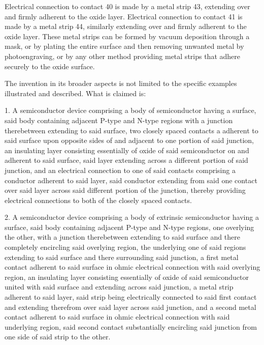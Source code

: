 Electrical connection to contact 40 is made by a metal strip 43, extending over and firmly adherent to the oxide layer. Electrical connection to contact 41 is made by a metal strip 44, similarly extending over and firmly adherent to the oxide layer. These metal strips can be formed by vacuum deposition through a mask, or by plating the entire surface and then removing unwanted metal by photoengraving, or by any other method providing metal strips that adhere securely to the oxide surface.

The invention in its broader aspects is not limited to the specific examples illustrated and described. What is claimed is:

1. A semiconductor device comprising a body of semiconductor having a surface, said body containing adjacent P-type and N-type regions with a junction therebetween extending to said surface, two closely spaced contacts a adherent to said surface upon opposite sides of and adjacent to one portion of said junction, an insulating layer consisting essentially of oxide of said semiconductor on and adherent to said surface, said layer extending across a different portion of said junction, and an electrical connection to one of said contacts comprising a conductor adherent to said layer, said conductor extending from said one contact over said layer across said different portion of the junction, thereby providing electrical connections to both of the closely spaced contacts.

2. A semiconductor device comprising a body of extrinsic semiconductor having a surface, said body containing adjacent P-type and N-type regions, one overlying the other, with a junction therebetween extending to said surface and there completely encircling said overlying region, the underlying one of said regions extending to said surface and there surrounding said junction, a first metal contact adherent to said surface in ohmic electrical connection with said overlying region, an insulating layer consisting essentially of oxide of said semiconductor united with said surface and extending across said junction, a metal strip adherent to said layer, said strip being electrically connected to said first contact and extending therefrom over said layer across said junction, and a second metal contact adherent to said surface in ohmic electrical connection with said underlying region, said second contact substantially encircling said junction from one side of said strip to the other.

